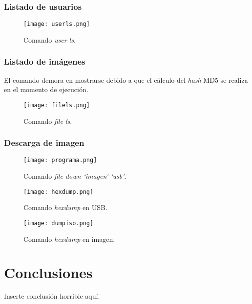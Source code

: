 \documentclass[12pt,a4paper]{article}
\begin{document}
\subsubsection{Listado de usuarios}
\label{users}

\begin{figure}[H]
  \centering
  \texttt{[image: userls.png]}
  \caption{Comando \emph{user ls}.}
  \label{userls}
\end{figure}

\subsubsection{Listado de imágenes}
\label{files}

El comando demora en mostrarse debido a que el cálculo del \emph{hash} MD5 se
realiza en el momento de ejecución.

\begin{figure}[H]
  \centering
  \texttt{[image: filels.png]}
  \caption{Comando \emph{file ls}.}
  \label{filels}
\end{figure}

\subsubsection{Descarga de imagen}
\label{down}

\begin{figure}[H]
  \centering
  \texttt{[image: programa.png]}
  \caption{Comando \emph{file down `imagen' `usb'}.}
  \label{filedown}
\end{figure}

\begin{figure}[H]
  \centering
  \texttt{[image: hexdump.png]}
  \caption{Comando \emph{hexdump} en USB.}
  \label{dumpusb}
\end{figure}

\begin{figure}[H]
  \centering
  \texttt{[image: dumpiso.png]}
  \caption{Comando \emph{hexdump} en imagen.}
  \label{dumpiso}
\end{figure}

\section{Conclusiones}
\label{conc}
Inserte conclusión horrible aquí.
\end{document}
